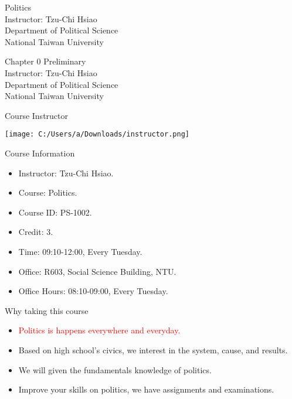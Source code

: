 \documentclass{beamer}
\title{}
\author{}
\date{}
\begin{document}
\begin{frame}
\begin{center}
\Large{Politics} \\
\vspace{3em}
\normalsize{Instructor: Tzu-Chi Hsiao} \\
\vspace{3em}
\small{Department of Political Science} \\
\vspace{1em}
\small{National Taiwan University}
\end{center}
\end{frame}
\begin{frame}
\begin{center}
\Large{Chapter 0 Preliminary} \\
\vspace{3em}
\normalsize{Instructor: Tzu-Chi Hsiao} \\
\vspace{3em}
\small{Department of Political Science} \\
\vspace{1em}
\small{National Taiwan University} \\
\end{center}
\end{frame}
\begin{frame}{Course Instructor}
\begin{center}
\texttt{[image: C:/Users/a/Downloads/instructor.png]}
\end{center}
\end{frame}
\begin{frame}{Course Information}
\begin{itemize}
\pause
\item Instructor: Tzu-Chi Hsiao.
\pause
\item Course: Politics.
\pause
\item Course ID: PS-1002.
\pause
\item Credit: 3.
\pause
\item Time: 09:10-12:00, Every Tuesday.
\pause
\item Office: R603, Social Science Building, NTU.
\pause
\item Office Hours: 08:10-09:00, Every Tuesday.
\end{itemize}
\end{frame}
\begin{frame}{Why taking this course}
\begin{itemize}
\pause
\item \textcolor{red}{Politics is happens everywhere and everyday.}
\pause
\item Based on high school's civics, we interest in the system, cause, and results.
\pause
\item We will given the fundamentals knowledge of politics.
\pause
\item Improve your skills on politics, we have assignments and examinations.
\end{itemize}
\end{frame}
\end{document}
